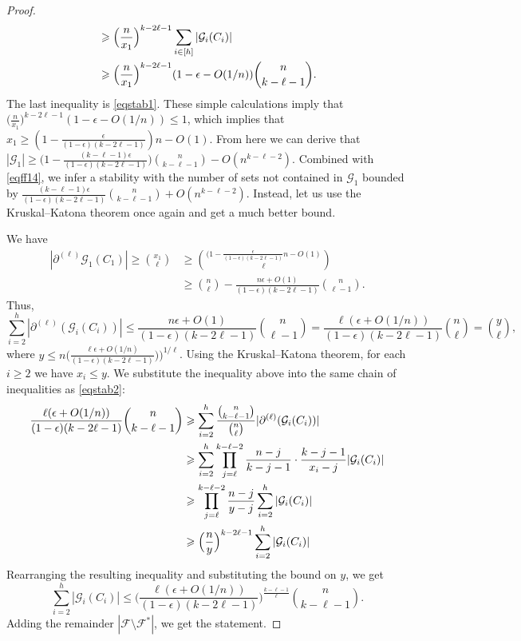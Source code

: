 \documentclass[graybox]{svmult}
\renewcommand{\le}{\leqslant}
\renewcommand{\ge}{\geqslant}
\newcommand{\ff}{\mathcal{F}}
\newcommand{\m}{\mathcal}
\begin{document}
\begin{proof}
\begin{align}
 \notag &\ge  \Big(\frac{n}{x_1}\Big)^{k-2\ell-1} \sum_{i\in [h]}|\m G_i(C_i)|\\
\label{eqstab2}  &\ge \Big(\frac{n}{x_1}\Big)^{k-2\ell-1} (1-\epsilon-O(1/n)){n\choose k-\ell-1}.
\end{align}
The last inequality is \eqref{eqstab1}. These simple calculations imply that $\Big(\frac{n}{x_1}\Big)^{k-2\ell-1} (1-\epsilon-O(1/n)) \le 1$, which  implies that $x_1\ge (1-\frac{\epsilon}{(1-\epsilon)(k-2\ell-1)})n - O(1)$. From here we can derive that $|\m G_1|\ge \big(1-\frac{(k-\ell-1)\epsilon}{(1-\epsilon)(k-2\ell-1)}\big){n\choose k-\ell-1} - O(n^{k-\ell-2})$. Combined with \eqref{eqff14}, we infer a stability with the number of sets not contained in $\m G_1$ bounded by $\frac{(k-\ell-1)\epsilon}{(1-\epsilon)(k-2\ell-1)}{n\choose k-\ell-1} + O(n^{k-\ell-2})$. Instead, let us use the Kruskal--Katona theorem once again and get a much better bound.

We have 
\begin{align*}
|\m \partial^{(\ell)}\m G_1(C_1)|\ge {x_1\choose \ell}&\ge {(1-\frac{\epsilon}{(1-\epsilon)(k-2\ell-1)}n -O(1)\choose \ell}
\\
 &\ge {n\choose \ell}-\frac{n\epsilon+O(1)}{(1-\epsilon)(k-2\ell-1)} {n\choose \ell-1}.\end{align*}
 Thus, $$\sum_{i=2}^h |\partial^{(\ell)}(\m G_i(C_i))|\le \frac{n\epsilon+O(1)}{(1-\epsilon)(k-2\ell-1)} {n\choose \ell-1}=\frac{\ell(\epsilon+O(1/n))}{(1-\epsilon)(k-2\ell-1)} {n\choose \ell}={y\choose \ell},
$$
where $y\le n \Big(\frac{\ell\epsilon+O(1/n)}{(1-\epsilon)(k-2\ell-1)})\Big)^{1/\ell}$. Using the Kruskal--Katona theorem, for each $i\ge 2$ we have $x_i\le y$. We substitute the inequality above into the same chain of inequalities as \eqref{eqstab2}:
\begin{align}
 \notag \frac{\ell(\epsilon+O(1/n))}{(1-\epsilon)(k-2\ell-1)}{n\choose k-\ell-1} &\ge \sum_{i=2}^h\frac{{n\choose k-\ell-1}}{{n\choose \ell}}|\partial^{(\ell)}(\m G_i(C_i))| \\
 \notag &\ge  \sum_{i=2}^h\prod_{j=\ell}^{k-\ell-2}\frac{n-j}{k-j-1}\cdot \frac{k-j-1}{x_i-j} |\m G_i(C_i)|\\
 \notag &\ge   \prod_{j=\ell}^{k-\ell-2}\frac{n-j}{y-j} \sum_{i=2}^h|\m G_i(C_i)|\\
 \notag &\ge  \Big(\frac{n}{y}\Big)^{k-2\ell-1} \sum_{i=2}^h|\m G_i(C_i)|
\end{align}
Rearranging the resulting inequality and substituting the bound on $y$, we get
$$\sum_{i=2}^h|\m G_i(C_i)|\le \Big(\frac{\ell(\epsilon+O(1/n))}{(1-\epsilon)(k-2\ell-1)}\Big)^{\frac{k-\ell-1}\ell}{n\choose k-\ell-1}.$$
Adding the remainder $|\ff\setminus \ff^*|$, we get the statement.
\end{proof}
\end{document}
